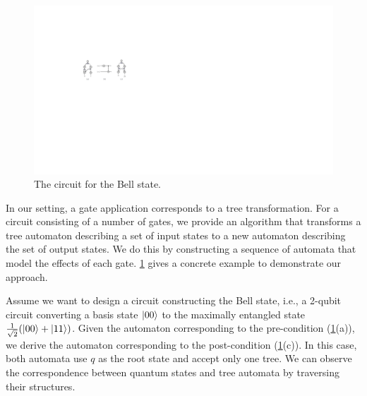 %
\begin{figure}
\includegraphics{Figures/Circuits/Bells}
\caption{The circuit for the Bell state.
  }
\label{Bells:fig}
\end{figure}
%
In our setting, a gate application corresponds to a tree transformation.
%
For a circuit consisting of a number of gates, we provide an algorithm that transforms a tree automaton describing a set of input states to a new automaton describing the set of output states.
%
We do this by constructing a sequence of automata that model the effects of each gate.
%
\cref{Bells:fig} gives a concrete example to demonstrate our approach.



Assume we want to design a circuit constructing the Bell state, i.e., a 2-qubit circuit converting a basis state $|00\rangle$ to the maximally entangled state $\frac{1}{\sqrt{2}}(|00\rangle + |11\rangle)$.
%
Given the automaton corresponding to the pre-condition (\cref{Bells:fig}(a)), we derive the automaton corresponding to the post-condition (\cref{Bells:fig}(c)).
%
In this case, both automata use $q$ as the root state and accept only one tree.
%
We can observe the correspondence between quantum states and tree automata by traversing their structures.

%
